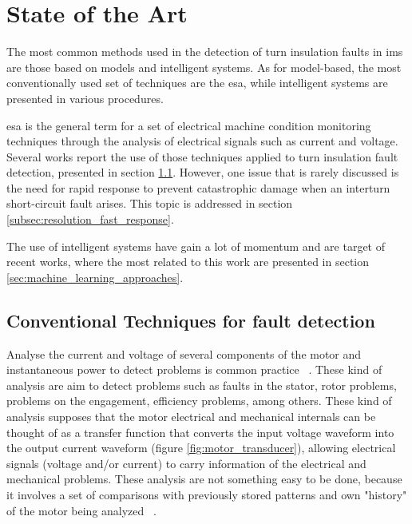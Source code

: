 \chapter{State of the Art}
\label{cha:state_of_the_art}

The most common methods used in the detection of turn insulation faults in \acrshort{ims} are those based on models and intelligent systems. As for model-based, the most conventionally used set of techniques are the \acrfull{esa}, while intelligent systems are presented in various 
procedures.

\acrshort{esa} is the general term for a set of electrical machine condition monitoring techniques through the analysis of electrical signals such as current and voltage. Several works report the use of those techniques applied to turn insulation fault detection, presented in section \ref{sec:conventional_techniques}. However, one issue that is rarely discussed is the need for rapid response to prevent catastrophic damage when an interturn short-circuit fault arises. This topic is addressed in section \ref{subsec:resolution_fast_response}.

The use of intelligent systems have gain a lot of momentum and are target of recent works, where the most related to this work are presented in section \ref{sec:machine_learning_approaches}.



\section{Conventional Techniques for fault detection} %
\label{sec:conventional_techniques}

Analyse the current and voltage of several components of the motor and instantaneous power to detect problems is common practice ~\cite{Bonaldi2012}. These kind of analysis  are aim to detect problems such as faults in the stator, rotor problems, problems on the engagement, efficiency problems, among others. These kind of analysis supposes that the motor electrical and mechanical internals can be thought of as a transfer function  that converts the input voltage waveform into the output current waveform (figure \ref{fig:motor_transducer}), allowing electrical signals (voltage and/or current) to carry information of the electrical and mechanical problems.
These analysis are not something easy to be done, because it involves a set of comparisons with previously stored patterns and own "history" of the motor being analyzed ~\cite{Bonaldi2012}. 


